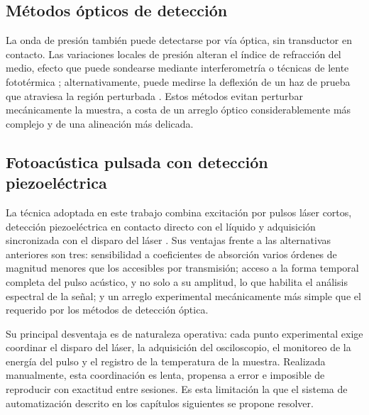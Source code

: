 \subsection*{Métodos ópticos de detección}

La onda de presión también puede detectarse por vía óptica, sin
transductor en contacto. Las variaciones locales de presión alteran
el índice de refracción del medio, efecto que puede sondearse
mediante interferometría o técnicas de lente fototérmica
\cite{Astrath2023}; alternativamente, puede medirse la deflexión de
un haz de prueba que atraviesa la región perturbada \cite{Quan1994}.
Estos métodos evitan perturbar mecánicamente la muestra, a costa de
un arreglo óptico considerablemente más complejo y de una
alineación más delicada.

\subsection*{Fotoacústica pulsada con detección piezoeléctrica}

La técnica adoptada en este trabajo combina excitación por pulsos
láser cortos, detección piezoeléctrica en contacto directo con el
líquido y adquisición sincronizada con el disparo del láser
\cite{PatelTam1981}. Sus ventajas frente a las alternativas
anteriores son tres: sensibilidad a coeficientes de absorción
varios órdenes de magnitud menores que los accesibles por
transmisión; acceso a la forma temporal completa del pulso
acústico, y no solo a su amplitud, lo que habilita el análisis
espectral de la señal; y un arreglo experimental mecánicamente más
simple que el requerido por los métodos de detección óptica.

Su principal desventaja es de naturaleza operativa: cada punto
experimental exige coordinar el disparo del láser, la adquisición
del osciloscopio, el monitoreo de la energía del pulso y el
registro de la temperatura de la muestra. Realizada manualmente,
esta coordinación es lenta, propensa a error e imposible de
reproducir con exactitud entre sesiones. Es esta limitación la que
el sistema de automatización descrito en los capítulos siguientes
se propone resolver.
